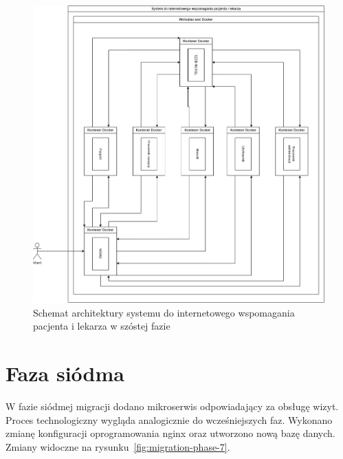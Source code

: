 \documentclass[12pt,oneside]{book}
\newcommand{\captionvspace}{\vspace{6pt}}
\begin{document}
    \begin{figure}[ht]
        \centering
        \includegraphics[width=\textwidth]{includes/images/migration-phase-6.png}
        \captionvspace
        \caption{Schemat architektury systemu do internetowego wspomagania pacjenta i lekarza w szóstej fazie}
        \label{fig:migration-phase-6}
    \end{figure}


    \section{Faza siódma}
    W fazie siódmej migracji dodano mikroserwis odpowiadający za obsługę wizyt. Proces technologiczny wygląda analogicznie do wcześniejszych faz. Wykonano zmianę konfiguracji oprogramowania nginx oraz utworzono nową bazę danych. Zmiany widoczne na rysunku~\ref{fig:migration-phase-7}.
\end{document}
